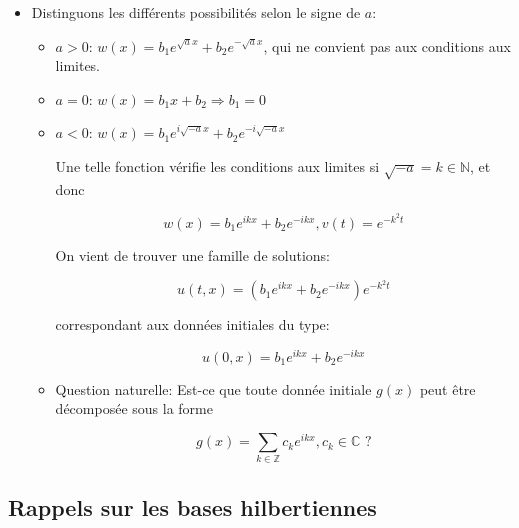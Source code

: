 \documentclass[10pt,a4paper,oneside]{article}
\begin{document}
\begin{itemize}
\item
Distinguons les différents possibilités selon le signe de $a$:

\begin{itemize}
\item
$a > 0$: $w(x) = b_1 e^{\sqrt{a}x} + b_2 e^{-\sqrt{a}x}$, qui ne convient pas aux conditions aux limites.

\item
$a = 0$: $w(x) = b_1 x + b_2 \Rightarrow b_1 = 0$

\item
$a < 0$: $w(x) = b_1 e^{i \sqrt{-a}x} + b_2 e^{-i \sqrt{-a}x}$

Une telle fonction vérifie les conditions aux limites si $\sqrt{-a} = k \in \mathbb{N}$, et donc

\[ w(x) = b_1 e^{ikx} + b_2 e^{-ikx}, v(t) = e^{-k^2t} \]

On vient de trouver une famille de solutions:

\[ u(t,x) = (b_1 e^{ikx} + b_2 e^{-ikx})e^{-k^2t} \]

correspondant aux données initiales du type:

\[ u(0,x) = b_1 e^{ikx} + b_2 e^{-ikx} \]

\item
Question naturelle: Est-ce que toute donnée initiale $g(x)$ peut être décomposée sous la forme

\[ g(x) = \underset{k \in \mathbb{Z}}{\sum} c_k e^{ikx}, c_k \in \mathbb{C} \text{ ?} \]

\end{itemize}

\end{itemize}

\subsection{Rappels sur les bases hilbertiennes}
\end{document}
